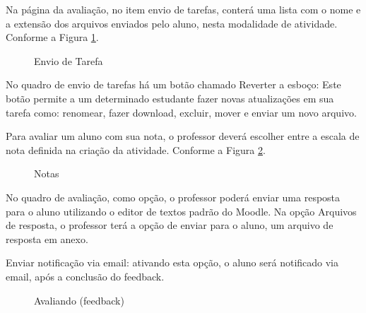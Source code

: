 Na página da avaliação, no item envio de tarefas, conterá uma lista com o nome e a extensão dos arquivos enviados pelo aluno, nesta modalidade de atividade. Conforme a Figura \ref{fig:cap5_29}.

\begin{figure}[htbp]
 \begin{center}
  \caption{Envio de Tarefa}
  \label{fig:cap5_29}
 \end{center}
\end{figure}

No quadro de envio de tarefas há um botão chamado Reverter a esboço: Este botão permite a um determinado estudante fazer novas atualizações em sua tarefa como: renomear, fazer download, excluir, mover e enviar um novo arquivo.

Para avaliar um aluno com sua nota, o professor deverá escolher entre a escala de nota definida na criação da atividade. Conforme a Figura \ref{fig:cap5_30}.

\begin{figure}[htbp]
 \begin{center}
  \caption{Notas}
  \label{fig:cap5_30}
 \end{center}
\end{figure}

No quadro de avaliação, como opção, o professor poderá enviar uma resposta para o aluno utilizando o editor de textos padrão do Moodle. Na opção Arquivos de resposta, o professor terá a opção de enviar para o aluno, um arquivo de resposta em anexo.

Enviar notificação via email: ativando esta opção, o aluno será notificado via email, após a conclusão do feedback.

\begin{figure}[htbp]
 \begin{center}
  \caption{Avaliando (feedback)}
  \label{fig:cap5_31}
 \end{center}
\end{figure}


